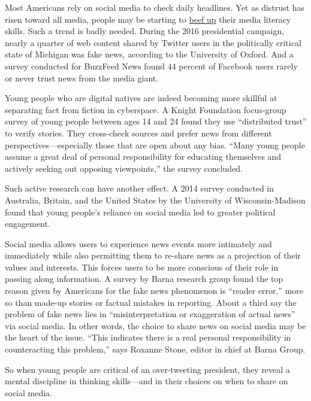 Most Americans rely on social media to check daily headlines. Yet as
distrust has risen toward all media, people may be starting to
\uline{beef up} their media literacy skills. Such a trend is badly
needed. During the 2016 presidential campaign, nearly a quarter of web
content shared by Twitter users in the politically critical state of
Michigan was fake news, according to the University of Oxford. And a
survey conducted for BuzzFeed News found 44 percent of Facebook users
rarely or never trust news from the media giant.

Young people who are digital natives are indeed becoming more skillful
at separating fact from fiction in cyberspace. A Knight Foundation
focus-group survey of young people between ages 14 and 24 found they use
``distributed trust'' to verify stories. They cross-check sources and
prefer news from different perspectives---especially those that are open
about any bias. ``Many young people assume a great deal of personal
responsibility for educating themselves and actively seeking out
opposing viewpoints,'' the survey concluded.

Such active research can have another effect. A 2014 survey conducted
in Australia, Britain, and the United States by the University of
Wisconsin-Madison found that young people's reliance on social media led
to greater political engagement.

Social media allows users to experience news events more intimately and
immediately while also permitting them to re-share news as a projection
of their values and interests. This forces users to be more conscious
of their role in passing along information. A survey by Barna research
group found the top reason given by Americans for the fake news
phenomenon is ``reader error,'' more so than made-up stories or factual
mistakes in reporting. About a third say the problem of fake news lies
in ``misinterpretation or exaggeration of actual news'' via social
media. In other words, the choice to share news on social media may be
the heart of the issue. ``This indicates there is a real personal
responsibility in counteracting this problem,'' says Roxanne Stone,
editor in chief at Barna Group.

So when young people are critical of an over-tweeting president, they
reveal a mental discipline in thinking skills---and in their choices on
when to share on social media.



